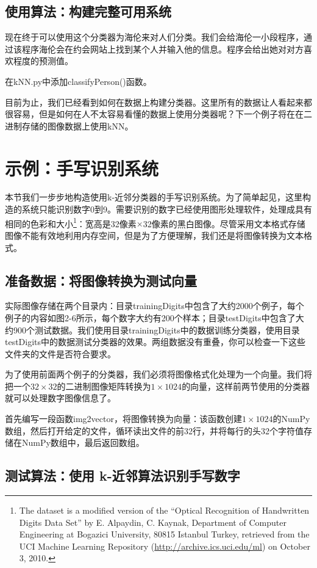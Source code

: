 \subsection{使用算法：构建完整可用系统}
现在终于可以使用这个分类器为海伦来对人们分类。我们会给海伦一小段程序，通过该程序海伦会在约会网站上找到某个人并输入他的信息。程序会给出她对对方喜欢程度的预测值。

在kNN.py中添加classifyPerson()函数。

目前为止，我们已经看到如何在数据上构建分类器。这里所有的数据让人看起来都很容易，但是如何在人不太容易看懂的数据上使用分类器呢？下一个例子将在在二进制存储的图像数据上使用kNN。

\section{示例：手写识别系统}
本节我们一步步地构造使用k-近邻分类器的手写识别系统。为了简单起见，这里构造的系统只能识别数字0到9。需要识别的数字已经使用图形处理软件，处理成具有相同的色彩和大小\footnote{The dataset is a modified version of the “Optical Recognition of Handwritten Digits Data Set” by E. Alpaydin, C. Kaynak, Department of Computer Engineering at Bogazici University, 80815 Istanbul Turkey, retrieved from the UCI Machine Learning Repository (\url{http://archive.ics.uci.edu/ml}) on October 3, 2010.}：宽高是32像素$\times$32像素的黑白图像。尽管采用文本格式存储图像不能有效地利用内存空间，但是为了方便理解，我们还是将图像转换为文本格式。

\subsection{准备数据：将图像转换为测试向量}
实际图像存储在两个目录内：目录trainingDigits中包含了大约2000个例子，每个例子的内容如图2-6所示，每个数字大约有200个样本；目录testDigits中包含了大约900个测试数据。我们使用目录trainingDigits中的数据训练分类器，使用目录testDigits中的数据测试分类器的效果。两组数据没有重叠，你可以检查一下这些文件夹的文件是否符合要求。

为了使用前面两个例子的分类器，我们必须将图像格式化处理为一个向量。我们将把一个$32\times32$的二进制图像矩阵转换为$1\times1024$的向量，这样前两节使用的分类器就可以处理数字图像信息了。

首先编写一段函数img2vector，将图像转换为向量：该函数创建$1\times1024$的NumPy数组，然后打开给定的文件，循环读出文件的前32行，并将每行的头32个字符值存储在NumPy数组中，最后返回数组。

\subsection{测试算法：使用 k-近邻算法识别手写数字}

